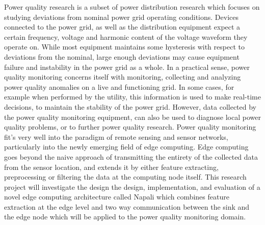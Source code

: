 Power quality research is a subset of power distribution research which focuses on studying  deviations from nominal power grid operating conditions. Devices connected to the power grid, as well as the distribution equipment expect a certain frequency, voltage and harmonic content of the voltage waveform they operate on. While most equipment maintains some hysteresis with respect to deviations from the nominal, large enough deviations may cause equipment failure and instability in the power grid as a whole. In a practical sense, power quality monitoring concerns itself with monitoring, collecting and analyzing power quality anomalies on a live and functioning grid. In some cases, for example when performed by the utility, this information is used to make real-time decisions, to maintain the stability of the power grid. However, data collected by the power quality monitoring equipment, can also be used to diagnose local power quality problems, or to further power quality research. Power quality monitoring fit's very well into the paradigm of remote sensing and sensor networks, particularly into the newly emerging field of edge computing. Edge computing goes beyond the naive approach of transmitting the entirety of the collected data from the sensor location, and extends it by either feature extracting, preprocessing or filtering the data at the computing node itself. This research project will investigate the design the design, implementation, and evaluation of a novel edge computing architecture  called Napali which combines feature extraction at the edge level and two way communication between the sink and the edge node which will be applied to the power quality monitoring domain.

